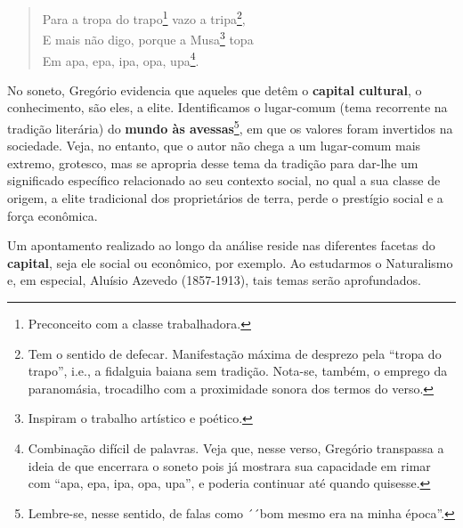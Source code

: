 \begin{verse}
Para a tropa do trapo\footnote{Preconceito com a classe trabalhadora.} vazo a tripa\footnote{Tem o sentido de defecar. Manifestação máxima de desprezo pela ``tropa do trapo'', i.e., a fidalguia baiana sem tradição. Nota-se, também, o emprego da paranomásia, trocadilho com a proximidade sonora dos termos do verso.}, \\
E mais não digo, porque a Musa\footnote{Inspiram o trabalho artístico e poético.} topa \\
Em apa, epa, ipa, opa, upa\footnote{Combinação difícil de palavras. Veja que, nesse verso, Gregório transpassa a ideia de que encerrara o soneto pois já mostrara sua capacidade em rimar com ``apa, epa, ipa, opa, upa'', e poderia continuar até quando quisesse.}. 
\end{verse}

No soneto, Gregório evidencia que aqueles que detêm o \textbf{capital cultural}, o conhecimento, são eles, a elite. Identificamos o lugar-comum (tema recorrente na tradição literária) do \textbf{mundo às avessas}\footnote{Lembre-se, nesse sentido, de falas como ´´bom mesmo era na minha época''.}, em que os valores foram invertidos na sociedade. Veja, no entanto, que o autor não chega a um lugar-comum mais extremo, grotesco, mas se apropria desse tema da tradição para dar-lhe um significado específico relacionado ao seu contexto social, no qual a sua classe de origem, a elite tradicional dos proprietários de terra, perde o prestígio social e a força econômica.

Um apontamento realizado ao longo da análise reside nas diferentes facetas do \textbf{capital}, seja ele social ou econômico, por exemplo. Ao estudarmos o Naturalismo e, em especial, Aluísio Azevedo (1857-1913), tais temas serão aprofundados.

